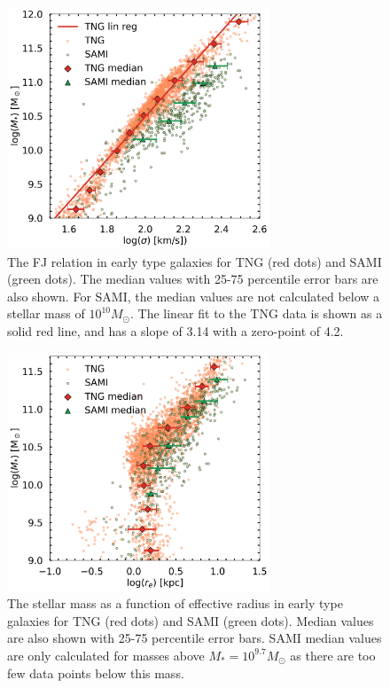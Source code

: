 \begin{figure}
    \centering
    \includegraphics[width=0.7\textwidth]{images/results_faber_jackson.png}
    \caption{The FJ relation in early type galaxies for TNG (red dots) and SAMI (green dots). The median values with 25-75 percentile error bars are also shown. For SAMI, the median values are not calculated below a stellar mass of $10^{10} M_\odot$. The linear fit to the TNG data is shown as a solid red line, and has a slope of 3.14 with a zero-point of 4.2.}
    \label{FJ_res}
\end{figure}

\begin{figure}
    \centering
    \includegraphics[width=0.7\textwidth]{images/results_mass_radius_FP.png}
    \caption{The stellar mass as a function of effective radius in early type galaxies for TNG (red dots) and SAMI (green dots). Median values are also shown with 25-75 percentile error bars. SAMI median values are only calculated for masses above $M_* = 10^{9.7} M_\odot$ as there are too few data points below this mass.}
    \label{FP_res1}
\end{figure}

